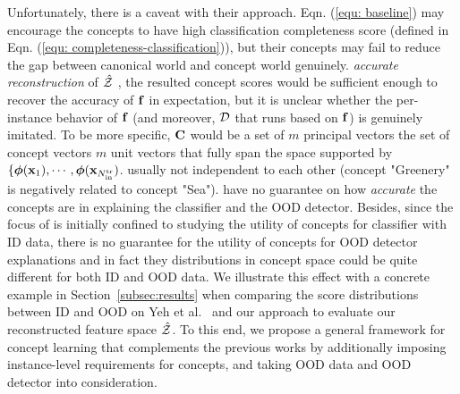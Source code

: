 Unfortunately, there is a caveat with their approach.
Eqn. (\ref{equ: baseline}) may encourage the concepts to have high classification completeness score (defined in Eqn. (\ref{equ: completeness-classification})), but their concepts may fail to reduce the gap between canonical world and concept world genuinely. 
\textit{accurate reconstruction} of $\hat{\mathcal{Z}}$
, the resulted concept scores would be sufficient enough to recover the accuracy of $\mathbf{f}$ in expectation, but it is unclear whether the per-instance behavior of $\mathbf{f}$ (and moreover, $\mathcal{D}$ that runs based on $\mathbf{f}$) is genuinely imitated.
To be more specific, $\mathbf{C}$ would be a set of $m$ principal vectors 
the set of concept vectors
$m$ unit vectors that fully span the space supported by $\{\bm{\phi}(\mathbf{x}_1), \cdots, \bm{\phi}(\mathbf{x}_{N_{\textrm{in}}^{\textrm{tr}}})$.
usually not independent to each other (\eg concept "Greenery" is negatively related to concept "Sea").
have no guarantee on how \textit{accurate} the concepts are in explaining the classifier and the OOD detector.
Besides, since the focus of \citep{yeh2020completeness} is initially confined to studying the utility of concepts for classifier with ID data, there is no guarantee for the utility of concepts for OOD detector explanations and in fact they distributions in concept space could be quite different for both ID and OOD data. We illustrate this effect with a concrete example in Section~\ref{subsec:results} when comparing the score distributions between ID and OOD on Yeh et al.~\citep{yeh2020completeness} and our approach to evaluate our reconstructed feature space $\hat{\mathcal{Z}}$. To this end, we propose a general framework for concept learning that complements the previous works by additionally imposing instance-level requirements for concepts, and taking OOD data and OOD detector into consideration.

\fi


